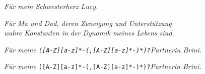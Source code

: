 \thispagestyle{empty}
{}

\vspace*{5cm}

\begin{center}
\textit{Für mein Schwesterherz Lucy.}

\vspace{2cm}

\textit{Für Ma und Dad, deren Zuneigung und Unterstützung\\ wahre Konstanten in der Dynamik meines Lebens sind.}

\vspace{2cm}
\textit{Für meine \texttt{([A-Z][a-z]*-(,[A-Z][a-z]*-)*)?}Partnerin Brini.}

\vspace{2cm}
\textit{Für meine} \texttt{([A-Z][a-z]*-(,[A-Z][a-z]*-)*)?}\textit{Partnerin Brini.}


\end{center}
